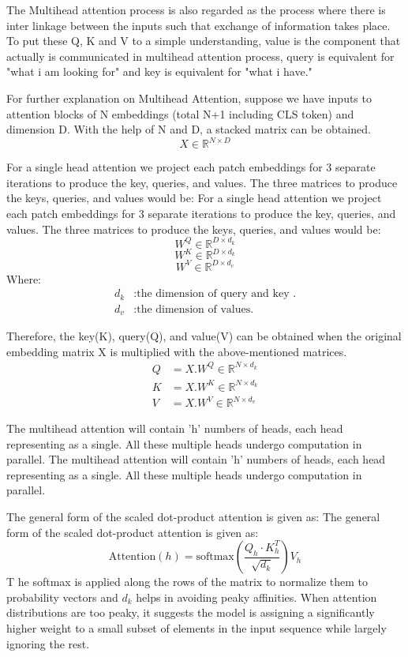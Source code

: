 \noindent The Multihead attention process is also regarded as the process where there is inter linkage between the inputs such that exchange of information takes place. To put these Q, K and V to a simple understanding, value is the component that actually is communicated in multihead attention process, query is equivalent for "what i am looking for" and key is equivalent for "what i have."

\noindent For further explanation on Multihead Attention, suppose we have inputs to attention blocks of N embeddings (total N+1 including CLS token) and dimension D. With the help of N and D, a stacked matrix can be obtained.
\[ X \in \mathbb{R}^{N \times D}\]

\noindent For a single head attention we project each patch embeddings for 3 separate iterations to produce the key, queries, and values. The three matrices to produce the keys, queries, and values would be:
\noindent For a single head attention we project each patch embeddings for 3 separate iterations to produce the key, queries, and values. The three matrices to produce the keys, queries, and values would be:
\[ W^Q \in \mathbb{R}^{D\times d_k}\]
\[ W^K \in \mathbb{R}^{D \times d_k}\]
\[ W^V \in \mathbb{R}^{D \times d_v}\]
Where:
\begin{align*}
    d_k & : \text{the dimension of query and key .} \\
    d_v & : \text{the dimension of values.}
\end{align*}

\noindent Therefore, the key(K), query(Q), and value(V) can be obtained when the original embedding matrix X is multiplied with the above-mentioned matrices.
\begin{align}
    Q & = X.W^Q \in \mathbb{R}^{N\times d_k} \\
    K & = X.W^K \in \mathbb{R}^{N\times d_k} \\
    V & = X.W^V \in \mathbb{R}^{N\times d_v}
\end{align}

\noindent The multihead attention will contain 'h' numbers of heads, each head representing as a single. All these multiple heads undergo computation in parallel.
\noindent The multihead attention will contain 'h' numbers of heads, each head representing as a single. All these multiple heads undergo computation in parallel.

\noindent The general form of the scaled dot-product attention is given as:
\noindent The general form of the scaled dot-product attention is given as:
\begin{equation}
    \text{Attention}(h) = \text{softmax}\left(\frac{Q_h \cdot K_h ^T}{\sqrt{d_k}}\right) V_h
\end{equation}
T
\noindent he softmax is applied along the rows of the matrix to normalize them to probability vectors and $d_k$ helps in avoiding peaky affinities. When attention distributions are too peaky, it suggests the model is assigning a significantly higher weight to a small subset of elements in the input sequence while largely ignoring the rest.

